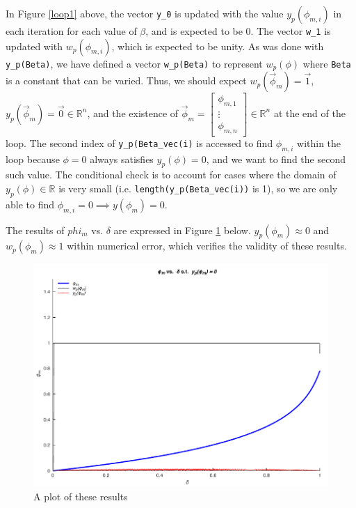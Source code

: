 \documentclass[11pt]{article}
\begin{document}
In Figure \ref{loop1} above, the vector \verb|y_0| is updated with the value $y_p(\phi_{m,i})$ in each iteration
for each value of $\beta$, and is expected to be 0. The vector \verb|w_1| is updated with $w_p(\phi_{m,i})$, which is expected to be unity. As was done with \verb|y_p(Beta)|, 
we have defined a vector \verb|w_p(Beta)| to represent $w_p(\phi)$ where \verb|Beta| is a constant that can be varied.
Thus, we should expect $w_p(\vec\phi_m)=\vec{1}$, $y_p(\vec\phi_m)=\vec{0}\in \mathbb{R}^n$, and the existence of $\vec\phi_m=\begin{bmatrix}\phi_{m,1}\\\vdots\\\phi_{m,n}\end{bmatrix}\in \mathbb{R}^n$ at the end of the loop.
The second index of \verb|y_p(Beta_vec(i)| is accessed to find $\phi_{m,i}$ within the loop because $\phi=0$ always satisfies $y_p(\phi)=0$, and we want to find the second such value.
The conditional check is to account for cases where the domain of $y_p(\phi)\in \mathbb{R}$ is very small (i.e. \verb|length(y_p(Beta_vec(i))| is 1), so we are only able to find $\phi_{m,i}=0\implies y(\phi_m)=0$.

The results of $phi_m$ vs. $\delta$ are expressed in Figure \ref{yminplot} below. $y_p(\phi_m)\approx 0$ and $w_p(\phi_m)\approx 1$ within numerical error, which verifies the validity of these results.

\begin{figure}[H]
    \centering
    \includegraphics{plots/phi_delta_y.pdf}
    \caption{A plot of these results}\label{yminplot}
\end{figure}
\end{document}
